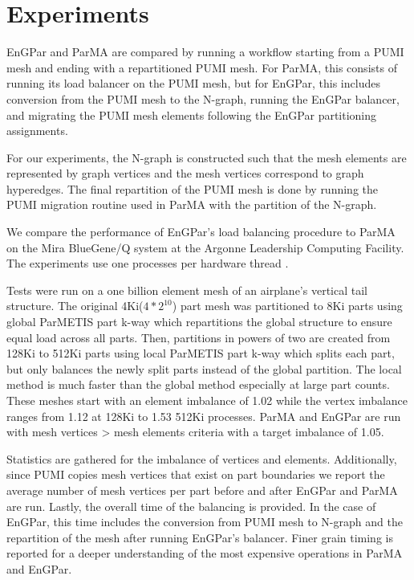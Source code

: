 
\section{Experiments}
EnGPar and ParMA are compared by running a workflow
starting from a PUMI mesh and ending with a repartitioned
PUMI mesh.
For ParMA, this consists of running its load balancer
on the PUMI mesh,
but for EnGPar, this includes conversion from the PUMI mesh
to the N-graph, running the EnGPar balancer, and
migrating the PUMI mesh elements following the EnGPar partitioning assignments.

For our experiments,
the N-graph is constructed such that the mesh elements are
represented by graph vertices and the mesh vertices correspond
to graph hyperedges. The final repartition of the PUMI mesh
is done by running the PUMI migration routine used in ParMA
with the partition of the N-graph.

We compare the performance of EnGPar's load balancing
procedure to ParMA on the Mira BlueGene/Q system at
the Argonne Leadership Computing Facility. The
experiments use one processes per hardware thread \cite{haring2012ibm}.

Tests were run on a one billion element mesh
of an airplane's vertical tail structure. The original
4Ki($4*2^{10}$) part mesh was partitioned to 8Ki parts using 
global ParMETIS part k-way \cite{karypis1999parallel}
which repartitions the global structure to ensure
equal load across all parts. Then, partitions in
powers of two are created from 128Ki to 512Ki parts
using local ParMETIS part k-way which splits each
part, but only balances the newly split parts instead
of the global partition. The local method is much
faster than the global method especially at large
part counts. These meshes start with an element imbalance
of 1.02 while the vertex imbalance ranges from 1.12 at 128Ki
to 1.53 512Ki processes. ParMA and EnGPar are run with
mesh vertices > mesh elements criteria with a target
imbalance of 1.05.

Statistics are gathered for the
imbalance of vertices and elements. Additionally, since PUMI copies mesh vertices that
exist on part boundaries we report the average number of
mesh vertices per part before and after EnGPar and ParMA
are run. Lastly, the overall time of the
balancing is provided. In the case of EnGPar, this time includes the
conversion from PUMI mesh to N-graph and the repartition of the
mesh after running EnGPar's balancer. Finer grain timing is
reported for a deeper understanding of the most expensive
operations in ParMA and EnGPar.

